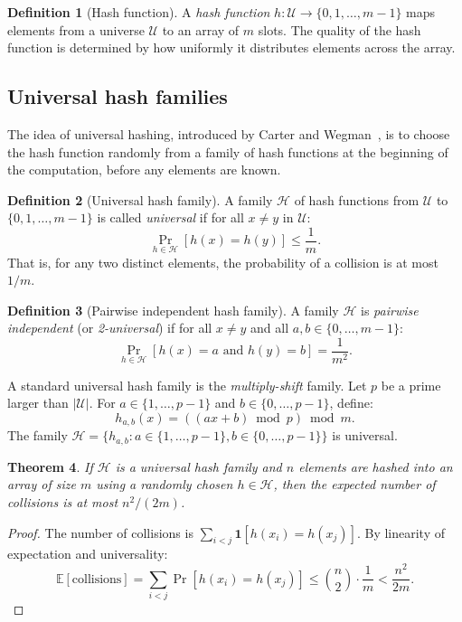 \documentclass[twoside,12pt]{book}
\theoremstyle{plain}
\newtheorem{theorem}{Theorem}[chapter]
\theoremstyle{definition}
\newtheorem{definition}[theorem]{Definition}
\theoremstyle{remark}
\begin{document}
\begin{definition}[Hash function]
A \emph{hash function} $h: \mathcal{U} \to \{0, 1, \ldots, m-1\}$ maps elements from a universe $\mathcal{U}$ to an array of $m$ slots. The quality of the hash function is determined by how uniformly it distributes elements across the array.
\end{definition}

\subsection{Universal hash families}

The idea of universal hashing, introduced by Carter and Wegman~\cite{carter1979}, is to choose the hash function randomly from a family of hash functions at the beginning of the computation, before any elements are known.

\begin{definition}[Universal hash family]
A family $\mathcal{H}$ of hash functions from $\mathcal{U}$ to $\{0, 1, \ldots, m-1\}$ is called \emph{universal} if for all $x \neq y$ in $\mathcal{U}$:
\[
\Pr_{h \in \mathcal{H}}[h(x) = h(y)] \leq \frac{1}{m}.
\]
That is, for any two distinct elements, the probability of a collision is at most $1/m$.
\end{definition}

\begin{definition}[Pairwise independent hash family]
A family $\mathcal{H}$ is \emph{pairwise independent} (or \emph{2-universal}) if for all $x \neq y$ and all $a, b \in \{0, \ldots, m-1\}$:
\[
\Pr_{h \in \mathcal{H}}[h(x) = a \text{ and } h(y) = b] = \frac{1}{m^2}.
\]
\end{definition}

A standard universal hash family is the \emph{multiply-shift} family. Let $p$ be a prime larger than $|\mathcal{U}|$. For $a \in \{1, \ldots, p-1\}$ and $b \in \{0, \ldots, p-1\}$, define:
\[
h_{a,b}(x) = ((ax + b) \bmod p) \bmod m.
\]
The family $\mathcal{H} = \{h_{a,b} : a \in \{1, \ldots, p-1\}, b \in \{0, \ldots, p-1\}\}$ is universal.

\begin{theorem}\label{thm:universal-hash}
If $\mathcal{H}$ is a universal hash family and $n$ elements are hashed into an array of size $m$ using a randomly chosen $h \in \mathcal{H}$, then the expected number of collisions is at most $n^2/(2m)$.
\end{theorem}

\begin{proof}
The number of collisions is $\sum_{i < j} \mathbf{1}[h(x_i) = h(x_j)]$. By linearity of expectation and universality:
\[
\mathbb{E}[\text{collisions}] = \sum_{i < j} \Pr[h(x_i) = h(x_j)] \leq \binom{n}{2} \cdot \frac{1}{m} < \frac{n^2}{2m}.
\]
\end{proof}
\end{document}
